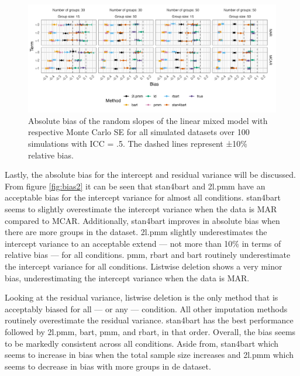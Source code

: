 \documentclass[10pt, a4paper, titlepage]{article}
\begin{document}
\begin{figure}[H]
    \centering
    \includegraphics[width=1\textwidth]{biasrandom.png}
    \caption{Absolute bias of the random slopes of the linear mixed model with respective Monte Carlo SE for all simulated datasets over 100 simulations with ICC = .5. The dashed lines represent ±10\% relative bias.}
    \label{fig:biasrandom}
\end{figure}

Lastly, the absolute bias for the intercept and residual variance will be discussed. From figure \ref{fig:bias2} it can be seen that stan4bart and 2l.pmm have an acceptable bias for the intercept variance for almost all conditions. stan4bart seems to slightly overestimate the intercept variance when the data is MAR compared to MCAR. Additionally, stan4bart improves in absolute bias when there are more groups in the dataset. 2l.pmm slightly underestimates the intercept variance to an acceptable extend --- not more than 10\% in terms of relative bias --- for all conditions. pmm, rbart and bart routinely underestimate the intercept variance for all conditions. Listwise deletion shows a very minor bias, underestimating the intercept variance when the data is MAR. 

Looking at the residual variance, listwise deletion is the only method that is acceptably biased for all --- or any --- condition. All other imputation methods routinely overestimate the residual variance. stan4bart has the best performance followed by 2l.pmm, bart, pmm, and rbart, in that order. Overall, the bias seems to be markedly consistent across all conditions. Aside from, stan4bart which seems to increase in bias when the total sample size increases and 2l.pmm which seems to decrease in bias with more groups in de dataset. 

\end{document}

